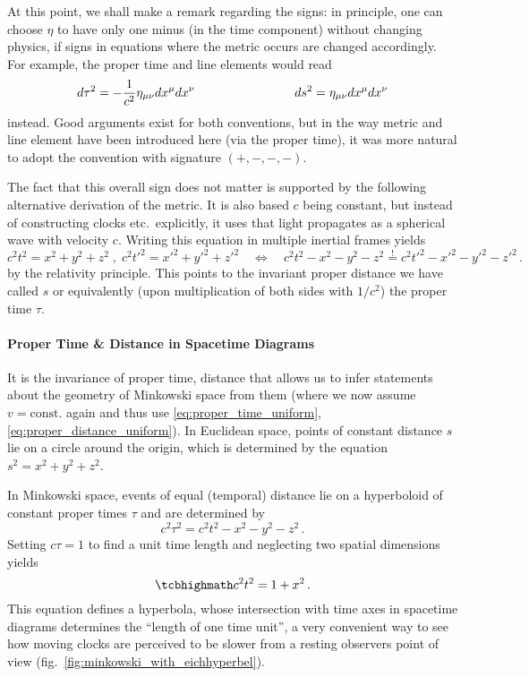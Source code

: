 \documentclass[relativity_main.tex]{subfiles}
\begin{document}
At this point, we shall make a remark regarding the signs: in principle, one can choose $\eta$ to have only one minus (in the time component) without changing physics, if signs in equations where the metric occurs are changed accordingly. For example, the proper time and line elements would read
\begin{equation}
	d\tau^2 = - \frac{1}{c^2} \eta_{\mu \nu} dx^\mu dx^\nu
	\qquad \qquad \qquad \qquad
	ds^2 = \eta_{\mu \nu} dx^\mu dx^\nu
\end{equation}
instead. Good arguments exist for both conventions, but in the way metric and line element have been introduced here (via the proper time), it was more natural to adopt the convention with signature $(+, -, -, -)$.

The fact that this overall sign does not matter is supported by the following alternative derivation of the metric. It is also based $c$ being constant, but instead of constructing clocks etc.~explicitly, it uses that light propagates as a spherical wave with velocity $c$. Writing this equation in multiple inertial frames yields
\begin{equation}
	c^2 t^2 = x^2 + y^2 + z^2 \; , \; c^2 t'^2 = x'^2 + y'^2 + z'^2 \quad \Leftrightarrow \quad c^2 t^2 - x^2 - y^2 - z^2 \overset{!}{=} c^2 t'^2 - x'^2 - y'^2 - z'^2 \, .
\end{equation}
by the relativity principle. This points to the invariant proper distance we have called $s$ or equivalently (upon multiplication of both sides with $1 / c^2$) the proper time $\tau$.



			\paragraph{Proper Time \& Distance in Spacetime Diagrams}
It is the invariance of proper time, distance that allows us to infer statements about the geometry of Minkowski space from them (where we now assume $v = \text{const.}$ again and thus use \eqref{eq:proper_time_uniform}, \eqref{eq:proper_distance_uniform}). In Euclidean space, points of constant distance $s$ lie on a circle around the origin, which is determined by the equation $s^2 = x^2 + y^2 + z^2$.

In Minkowski space, events of equal (temporal) distance lie on a hyperboloid of constant proper times $\tau$ and are determined by
\begin{equation*}
	c^2 \tau^2 = c^2 t^2 - x^2 - y^2 - z^2 \, .
\end{equation*}
Setting $c \tau = 1$ to find a unit time length and neglecting two spatial dimensions yields
\begin{equation}
	\eqbox{
	c^2 t^2 = 1 + x^2
	} \, .
\end{equation}
This equation defines a hyperbola, whose intersection with time axes in spacetime diagrams determines the \enquote{length of one time unit}, a very convenient way to see how moving clocks are perceived to be slower from a resting observers point of view (fig.~\ref{fig:minkowski_with_eichhyperbel}).\\
\end{document}
